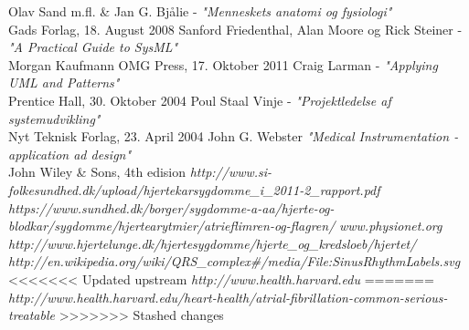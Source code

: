 \begin{thebibliography}{9}
 Olav Sand m.fl. \& Jan G. Bjålie - \textit{"Menneskets anatomi og fysiologi"}\\ Gads Forlag, 18. August 2008
 Sanford Friedenthal, Alan Moore og Rick Steiner - \textit{"A Practical Guide to SysML"} \\Morgan Kaufmann OMG Press, 17. Oktober 2011
 Craig Larman -
	\textit{"Applying UML and Patterns"}\\ Prentice Hall, 30. Oktober 2004
 Poul Staal Vinje - \textit{"Projektledelse af systemudvikling"}\\ Nyt Teknisk Forlag, 23. April 2004
 John G. Webster \textit{"Medical Instrumentation - application ad design"}\\ John Wiley & Sons, 4th edision
 \textit{http://www.si-folkesundhed.dk/upload/hjertekarsygdomme\_i\_2011-2\_rapport.pdf}
 \textit{https://www.sundhed.dk/borger/sygdomme-a-aa/hjerte-og-blodkar/sygdomme/hjertearytmier/atrieflimren-og-flagren/}
 \textit{www.physionet.org}
\textit{http://www.hjertelunge.dk/hjertesygdomme/hjerte\_og\_kredsloeb/hjertet/}
 \textit{http://en.wikipedia.org/wiki/QRS\_complex\#/media/File:SinusRhythmLabels.svg}
<<<<<<< Updated upstream
 \textit{http://www.health.harvard.edu} 
=======
 \textit{http://www.health.harvard.edu/heart-health/atrial-fibrillation-common-serious-treatable}
>>>>>>> Stashed changes

\end{thebibliography}